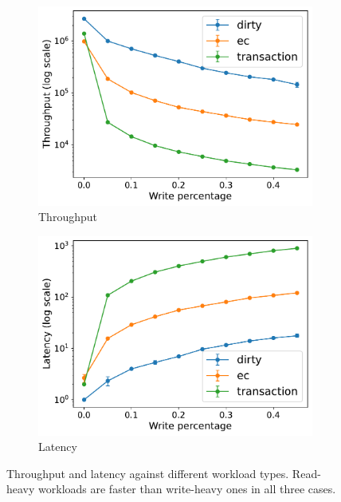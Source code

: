 \begin{figure}[htp]
  \centering
  \begin{subfigure}[t]{0.49\columnwidth}
    \centering
    \includegraphics[width=\columnwidth]{figures/tp_rw_caelum.pdf}
    \caption{Throughput}
    \label{fig:tp workload caelum}
  \end{subfigure}
  \begin{subfigure}[t]{0.49\columnwidth}
    \centering
    \includegraphics[width=\columnwidth]{figures/lat_rw_caelum.pdf}
    \caption{Latency}
    \label{fig:lat workload caelum}
  \end{subfigure}
  \caption{Throughput and latency against different workload types. Read-heavy
  workloads are faster than write-heavy ones in all three cases.}
  \label{fig:workload caelum}
\end{figure}

